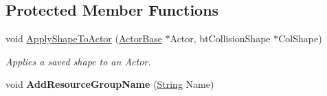 \subsection*{Protected Member Functions}
\begin{DoxyCompactItemize}
\item 
\hypertarget{classphys_1_1ResourceManager_a1823d2d08fc3b6052ed893896eef6291}{
void \hyperlink{classphys_1_1ResourceManager_a1823d2d08fc3b6052ed893896eef6291}{ApplyShapeToActor} (\hyperlink{classphys_1_1ActorBase}{ActorBase} $\ast$Actor, btCollisionShape $\ast$ColShape)}
\label{d1/d35/classphys_1_1ResourceManager_a1823d2d08fc3b6052ed893896eef6291}

\begin{DoxyCompactList}\small\item\em Applies a saved shape to an Actor. \item\end{DoxyCompactList}\item 
\hypertarget{classphys_1_1ResourceManager_a7c84034fc45e64fc3a07f736230afd38}{
void {\bfseries AddResourceGroupName} (\hyperlink{namespacephys_aa03900411993de7fbfec4789bc1d392e}{String} Name)}
\label{d1/d35/classphys_1_1ResourceManager_a7c84034fc45e64fc3a07f736230afd38}

\end{DoxyCompactItemize}
